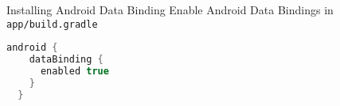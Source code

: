 \begin{frame}[fragile]{Installing Android Data Binding}
  Enable Android Data Bindings in \lstinline`app/build.gradle`

  \begin{lstlisting}[language=Java]
  android {
    dataBinding {
      enabled true
    }
  }
  \end{lstlisting}
\end{frame}
